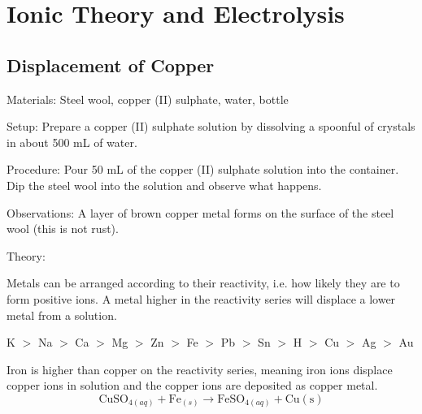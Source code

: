 \section{Ionic Theory and Electrolysis} 

\begin{multicols}{2}


\subsection{Displacement of Copper} 


\begin{description*}
\item[Materials:]{Steel wool, copper (II) sulphate, water, bottle}
\item[Setup:]{Prepare a copper (II) sulphate solution by dissolving a spoonful of crystals in about 500 mL of water.}
\item[Procedure:]{Pour 50 mL of the copper (II) sulphate solution into the container. Dip the steel wool into the solution and observe what happens.}
\item[Observations:]{A layer of brown copper metal forms on the surface of the steel wool (this is not rust).}
\item[Theory:]{

Metals can be arranged according to their reactivity, i.e. how likely they are to form positive ions. A metal higher in the reactivity series will displace a lower metal from a solution. 
\begin{center}
K $>$ Na $>$ Ca $>$ Mg $>$ Zn $>$ Fe $>$ Pb $>$ Sn $>$ H $>$ Cu $>$ Ag $>$ Au
\end{center}
Iron is higher than copper on the reactivity series, meaning iron ions displace copper ions in solution and the copper ions are deposited as copper metal. $$ \mathrm{CuSO}_{4(aq)} + \mathrm{Fe}_{(s)} \longrightarrow \mathrm{FeSO}_{4(aq)} + \mathrm{Cu(s)} $$}
\end{description*}


\end{multicols}
